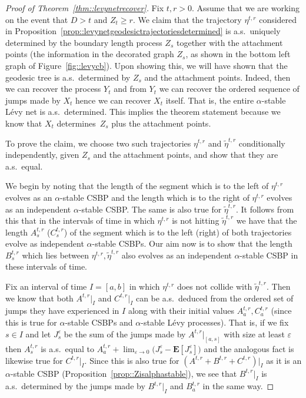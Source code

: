 \documentclass[JEP,XML,SOM,Unicode]{cedram}
\let\epsilon\varepsilon
\theoremstyle{plain}
\numberwithin{theorem}{section}
\theoremstyle{definition}
\newcommand \E {{\mathbf E}}
\let\wt\widetilde
\begin{document}
\begin{proof}[Proof of Theorem~\ref{thm::levynetrecover}]
Fix $t, r > 0$. Assume that we are working on the event that $D > t$ and $Z_t \geq r$. We claim that the trajectory $\eta^{t,r}$ considered in Proposition~\ref{prop::levynetgeodesictrajectoriesdetermined} is a.s.\ uniquely determined by the boundary length process $Z_s$ together with the attachment points (\ie the information in the decorated graph $Z_s$, as shown in the bottom left graph of Figure~\ref{fig::levycb}). Upon showing this, we will have shown that the geodesic tree is a.s.\ determined by $Z_s$ and the attachment points. Indeed, then we can recover the process $Y_t$ and from $Y_t$ we can recover the ordered sequence of jumps made by $X_t$ hence we can recover $X_t$ itself. That is, the entire $\alpha$-stable Lévy net is a.s.\ determined. This implies the theorem statement because we know that $X_t$ determines~$Z_s$ plus the attachment points.

To prove the claim, we choose two such trajectories $\eta^{t,r}$ and $\wt{\eta}^{t,r}$ conditionally independently, given $Z_s$ and the attachment points, and show that they are a.s.\ equal.

We begin by noting that the length of the segment which is to the left of $\eta^{t,r}$ evolves as an $\alpha$-stable CSBP and the length which is to the right of $\eta^{t,r}$ evolves as an independent $\alpha$-stable CSBP. The same is also true for $\wt{\eta}^{t,r}$. It follows from this that in the intervals of time in which $\eta^{t,r}$ is not hitting $\wt{\eta}^{t,r}$ we have that the length $A_s^{t,r}$ (\resp $C_s^{t,r}$) of the segment which is to the left (\resp right) of both trajectories evolve as independent $\alpha$-stable CSBPs. Our aim now is to show that the length $B_s^{t,r}$ which lies between $\eta^{t,r}, \wt{\eta}^{t,r}$ also evolves as an independent $\alpha$-stable CSBP in these intervals of time.

Fix an interval of time $I = [a,b]$ in which $\eta^{t,r}$ does not collide with $\wt{\eta}^{t,r}$. Then we know that both $A^{t,r}|_I$ and $C^{t,r}|_I$ can be a.s.\ deduced from the ordered set of jumps they have experienced in $I$ along with their initial values $A_a^{t,r},C_a^{t,r}$ (since this is true for $\alpha$-stable CSBPs and $\alpha$-stable Lévy processes). That is, if we fix $s \in I$ and let $J_s^\epsilon$ be the sum of the jumps made by $A^{t,r}|_{[a,s]}$ with size at least $\epsilon$ then $A_s^{t,r}$ is a.s.\ equal to $A_a^{t,r} + \lim_{\epsilon \to 0} \big( J_s^\epsilon - \E[ J_s^\epsilon] \big)$ and the analogous fact is likewise true for $C^{t,r}|_I$. Since this is also true for $(A^{t,r} + B^{t,r} + C^{t,r})|_I$ as it is an $\alpha$-stable CSBP (Proposition~\ref{prop::Zisalphastable}), we see that $B^{t,r}|_I$ is a.s.\ determined by the jumps made by $B^{t,r}|_I$ and $B_a^{t,r}$ in the same way.


\end{proof}
\end{document}
